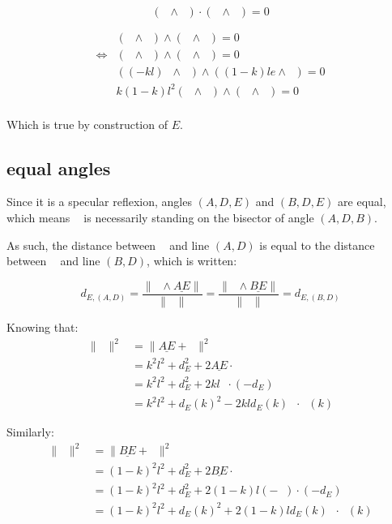 \documentclass[10pt,a4paper]{article}
\newcommand{\ud}[1]{\underline{#1}}
\DeclareMathOperator{\cross}{\wedge}
\DeclareMathOperator{\E}{\ud{E}}
\DeclareMathOperator{\DA}{\ud{DA}}
\DeclareMathOperator{\AD}{\ud{AD}}
\DeclareMathOperator{\DB}{\ud{DB}}
\DeclareMathOperator{\BD}{\ud{BD}}
\DeclareMathOperator{\ED}{\ud{ED}}
\DeclareMathOperator{\EA}{\ud{EA}}
\DeclareMathOperator{\EB}{\ud{EB}}
\DeclareMathOperator{\e}{\ud{e}}
\DeclareMathOperator{\n}{\ud{n}}
\begin{document}
\begin{equation}
( \DA \cross \n ) \cdot ( \DB \cross \n ) = 0
\end{equation}


$$
\begin{array}{lll}
    & ( \DA \cross \n ) \cross ( \DB \cross \n ) = 0\\
    \Leftrightarrow
    & ( \EA \cross \n ) \cross ( \EB \cross \n ) = 0\\
    & ( (-kl)\e \cross \n ) \cross ( (1-k)le \cross \n ) = 0\\
    & k(1-k)l^2(\e \cross \n) \cross (\e \cross \n) = 0\\
\end{array}
$$

Which is true by construction of $E$.

\subsection{equal angles}

Since it is a specular reflexion, angles $(A,D,E)$ and $(B,D,E)$ are equal,
which means $\E$ is necessarily standing on the bisector of angle $(A, D, B)$.

As such, the distance between $\E$ and line $(A, D)$ is equal to the distance
between $\E$ and line $(B, D)$, which is written:

$$
d_{E,(A,D)}
= \frac{\| \AD \cross \ud{AE} \|}{\| \AD \|}
= \frac{\| \BD \cross \ud{BE} \|}{\| \BD \|}
= d_{E,(B,D)}
$$

Knowing that:
$$
\begin{array}{lll}
    \| \AD \|^2
    & = \| \ud{AE} + \ED \|^2\\
    & = k^2l^2 + d_E^2 + 2\ud{AE} \cdot \ED\\
    & = k^2l^2 + d_E^2 + 2 kl\e \cdot (-d_E)\n\\
    & = k^2l^2 + d_E(k)^2 - 2 kld_E(k) \e \cdot \n(k)
\end{array}
$$

Similarly:
$$
\begin{array}{lll}
    \| \BD \|^2
    & = \| \ud{BE} + \ED \|^2\\
    & = (1-k)^2l^2 + d_E^2 + 2\ud{BE} \cdot \ED\\
    & = (1-k)^2l^2 + d_E^2 + 2 (1-k)l(-\e) \cdot (-d_E)\n\\
    & = (1-k)^2l^2 + d_E(k)^2 + 2 (1-k)ld_E(k) \e \cdot \n(k)
\end{array}
$$
\end{document}
